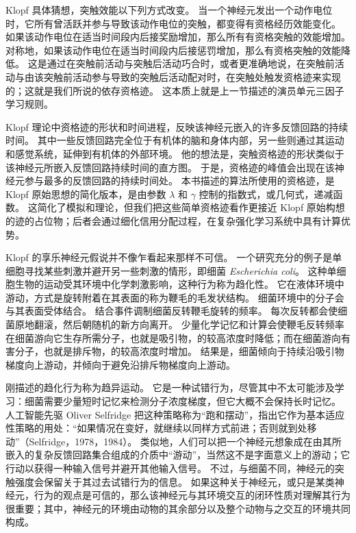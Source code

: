 \documentclass[UTF8, 12pt, fontset=fandol, oneside]{ctexart}
\begin{document}
Klopf 具体猜想，突触效能以下列方式改变。
当一个神经元发出一个动作电位时，它所有曾活跃并参与导致该动作电位的突触，都变得有资格经历效能变化。
如果该动作电位在适当时间段内后接奖励增加，那么所有有资格突触的效能增加。
对称地，如果该动作电位在适当时间段内后接惩罚增加，那么有资格突触的效能降低。
这是通过在突触前活动与突触后活动巧合时，或者更准确地说，在突触前活动与由该突触前活动参与导致的突触后活动配对时，在突触处触发资格迹来实现的；这就是我们所说的依存资格迹。
这本质上就是上一节描述的演员单元三因子学习规则。

Klopf 理论中资格迹的形状和时间进程，反映该神经元嵌入的许多反馈回路的持续时间。
其中一些反馈回路完全位于有机体的脑和身体内部，另一些则通过其运动和感觉系统，延伸到有机体的外部环境。
他的想法是，突触资格迹的形状类似于该神经元所嵌入反馈回路持续时间的直方图。
于是，资格迹的峰值会出现在该神经元参与最多的反馈回路的持续时间处。
本书描述的算法所使用的资格迹，是 Klopf 原始思想的简化版本，是由参数 $\lambda$ 和 $\gamma$ 控制的指数式，或几何式，递减函数。
这简化了模拟和理论，但我们把这些简单资格迹看作更接近 Klopf 原始构想的迹的占位物；后者会通过细化信用分配过程，在复杂强化学习系统中具有计算优势。

Klopf 的享乐神经元假说并不像乍看起来那样不可信。
一个研究充分的例子是单细胞寻找某些刺激并避开另一些刺激的情形，即细菌 \emph{Escherichia coli}。
这种单细胞生物的运动受其环境中化学刺激影响，这种行为称为趋化性。
它在液体环境中游动，方式是旋转附着在其表面的称为鞭毛的毛发状结构。
细菌环境中的分子会与其表面受体结合。
结合事件调制细菌反转鞭毛旋转的频率。
每次反转都会使细菌原地翻滚，然后朝随机的新方向离开。
少量化学记忆和计算会使鞭毛反转频率在细菌游向它生存所需分子，也就是吸引物，的较高浓度时降低；而在细菌游向有害分子，也就是排斥物，的较高浓度时增加。
结果是，细菌倾向于持续沿吸引物梯度向上游动，并倾向于避免沿排斥物梯度向上游动。

刚描述的趋化行为称为趋异运动。
它是一种试错行为，尽管其中不太可能涉及学习：细菌需要少量短时记忆来检测分子浓度梯度，但它大概不会保持长时记忆。
人工智能先驱 Oliver Selfridge 把这种策略称为“跑和摆动”，指出它作为基本适应性策略的用处：“如果情况在变好，就继续以同样方式前进；否则就到处移动”（Selfridge，1978，1984）。
类似地，人们可以把一个神经元想象成在由其所嵌入的复杂反馈回路集合组成的介质中“游动”，当然这不是字面意义上的游动；它行动以获得一种输入信号并避开其他输入信号。
不过，与细菌不同，神经元的突触强度会保留关于其过去试错行为的信息。
如果这种关于神经元，或只是某类神经元，行为的观点是可信的，那么该神经元与其环境交互的闭环性质对理解其行为很重要；其中，神经元的环境由动物的其余部分以及整个动物与之交互的环境共同构成。
\end{document}

